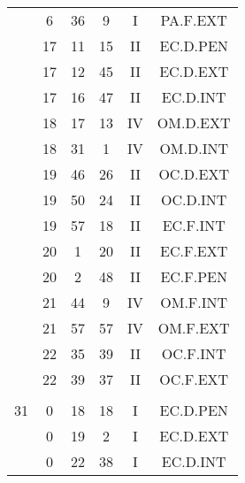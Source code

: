 \documentclass[12pt, a4paper]{article}
\begin{document}
\begin{multicols}{3}
{\begin{tabular}{c c c c c c}
	 	 	 	 & 6 & 36 & 9 & I & PA.F.EXT\\%
	 	 	 	 & 17 & 11 & 15 & II & EC.D.PEN\\%
	 	 	 	 & 17 & 12 & 45 & II & EC.D.EXT\\%
	 	 	 	 & 17 & 16 & 47 & II & EC.D.INT\\%
	 	 	 	 & 18 & 17 & 13 & IV & OM.D.EXT\\%
	 	 	 	 & 18 & 31 & 1 & IV & OM.D.INT\\%
	 	 	 	 & 19 & 46 & 26 & II & OC.D.EXT\\%
	 	 	 	 & 19 & 50 & 24 & II & OC.D.INT\\%
	 	 	 	 & 19 & 57 & 18 & II & EC.F.INT\\%
	 	 	 	 & 20 & 1 & 20 & II & EC.F.EXT\\%
	 	 	 	 & 20 & 2 & 48 & II & EC.F.PEN\\%
	 	 	 	 & 21 & 44 & 9 & IV & OM.F.INT\\%
	 	 	 	 & 21 & 57 & 57 & IV & OM.F.EXT\\%
	 	 	 	 & 22 & 35 & 39 & II & OC.F.INT\\%
	 	 	 	 & 22 & 39 & 37 & II & OC.F.EXT\\%
	 	 	 	 & & & & & \\%
	 	 	 	31 & 0 & 18 & 18 & I & EC.D.PEN\\%
	 	 	 	 & 0 & 19 & 2 & I & EC.D.EXT\\%
	 	 	 	 & 0 & 22 & 38 & I & EC.D.INT\\%
	 	 \end{tabular}
 	}
\end{multicols}
\end{document}
